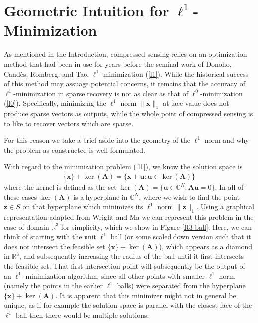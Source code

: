 \documentclass[12pt,a4paper]{amsart}
\numberwithin{equation}{section}
\theoremstyle{plain}
\theoremstyle{definition}
\newcommand{\BR}{\mathbb R}
\newcommand{\BC}{\mathbb C}
\newcommand{\bdx}{\mathbf{x}}
\newcommand{\bdz}{\mathbf{z}}
\newcommand{\bdu}{\mathbf{u}}
\newcommand{\bdA}{\mathbf{A}}
\begin{document}
\section{Geometric Intuition for $\ell^1$-Minimization}\label{geom-int}

As mentioned in the Introduction, compressed sensing relies on an optimization method that had been in use for years before the seminal work of Donoho, Cand\`{e}s, Romberg, and Tao, $\ell^1$-minimization (\ref{l1}). While the historical success of this method may assuage potential concerns, it remains that the accuracy of $\ell^1$-minimization in sparse recovery is not as clear as that of $\ell^0$-minimization (\ref{l0}). Specifically, minimizing the $\ell^1$ norm $\|\bdx\|_1$ at face value does not produce sparse vectors as outputs, while the whole point of compressed sensing is to like to recover vectors which are sparse.

For this reason we take a brief aside into the geometry of the $\ell^1$ norm and why the problem as constructed is well-formulated. 

With regard to the minimization problem (\ref{l1}), we know the solution space is
\begin{align*}
    \{\bdx\}+\ker(\bdA)=\{\bdx+\bdu:\bdu\in\ker(\bdA)\}
\end{align*}
where the kernel is defined as the set $\ker(\bdA)=\{\bdu\in\BC^N:\bdA\bdu=0\}$. In all of these cases $\ker(\bdA)$ is a hyperplane in $\BC^N$, where we wish to find the point $\bdz\in S$ on that hyperplane which minimizes its $\ell^1$ norm $\|\bdz\|_1$. Using a graphical representation adapted from Wright and Ma \cite{wm} we can represent this problem in the case of domain $\BR^3$ for simplicity, which we show in Figure \ref{R3-ball}. Here, we can think of starting with the unit $\ell^1$ ball (or some scaled down version such that it does not intersect the feasible set $\{\bdx\}+\ker(\bdA)$), which appears as a diamond in $\BR^3$, and subsequently increasing the radius of the ball until it first intersects the feasible set. That first intersection point will subsequently be the output of an $\ell^1$-minimization algorithm, since all other points with smaller $\ell^1$ norm (namely the points in the earlier $\ell^1$ balls) were separated from the hyperplane $\{\bdx\}+\ker(\bdA)$. It is apparent that this minimizer might not in general be unique, as if for example the solution space is parallel with the closest face of the $\ell^1$ ball then there would be multiple solutions.
\end{document}
